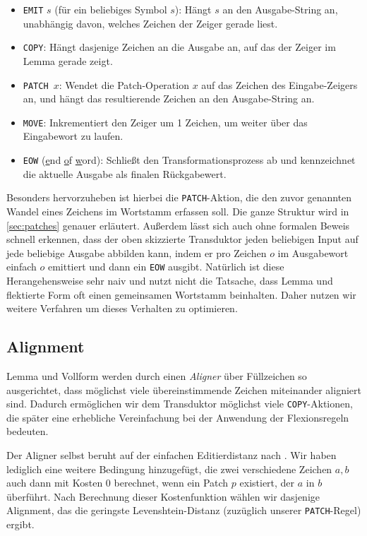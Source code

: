 \documentclass[11pt,a4paper]{article}
\newcommand{\action}[1]{\texttt{#1}}
\begin{document}
\begin{itemize}
    \item \action{EMIT} $s$ (für ein beliebiges Symbol $s$): Hängt $s$ an den Ausgabe-String an, unabhängig davon, welches Zeichen der Zeiger gerade liest.
    \item \action{COPY}: Hängt dasjenige Zeichen an die Ausgabe an, auf das der Zeiger im Lemma gerade zeigt.
    \item \action{PATCH $x$}: Wendet die Patch-Operation $x$ auf das Zeichen des Eingabe-Zeigers an, und hängt das resultierende Zeichen an den Ausgabe-String an.
    \item \action{MOVE}: Inkrementiert den Zeiger um 1 Zeichen, um weiter über das Eingabewort zu laufen.
    \item \action{EOW} (\underline{e}nd \underline{o}f \underline{w}ord): Schließt den Transformationsprozess ab und kennzeichnet die aktuelle Ausgabe als finalen Rückgabewert.
\end{itemize}

Besonders hervorzuheben ist hierbei die \action{PATCH}-Aktion, die den zuvor genannten Wandel eines Zeichens im Wortstamm erfassen soll. Die ganze Struktur wird in \autoref{sec:patches} genauer erläutert.
Außerdem lässt sich auch ohne formalen Beweis schnell erkennen, dass der oben skizzierte Transduktor jeden beliebigen Input auf jede beliebige Ausgabe abbilden kann, indem er pro Zeichen $o$ im Ausgabewort einfach $o$ emittiert und dann ein \action{EOW} ausgibt. Natürlich ist diese Herangehensweise sehr naiv und nutzt nicht die Tatsache, dass Lemma und flektierte Form oft einen gemeinsamen Wortstamm beinhalten. Daher nutzen wir weitere Verfahren um dieses Verhalten zu optimieren.

\subsection{Alignment}
\label{sec:alignment}
Lemma und Vollform werden durch einen \textit{Aligner} über Füllzeichen so ausgerichtet, dass möglichst viele übereinstimmende Zeichen miteinander aligniert sind. Dadurch ermöglichen wir dem Transduktor möglichst viele \action{COPY}-Aktionen, die später eine erhebliche Vereinfachung bei der Anwendung der Flexionsregeln bedeuten.

Der Aligner selbst beruht auf der einfachen Editierdistanz nach \citet{levenshtein:binary66}. Wir haben lediglich eine weitere Bedingung hinzugefügt, die zwei verschiedene Zeichen $a, b$ auch dann mit Kosten $0$ berechnet, wenn ein Patch $p$ existiert, der $a$ in $b$ überführt. Nach Berechnung dieser Kostenfunktion wählen wir dasjenige Alignment, das die geringste Levenshtein-Distanz (zuzüglich unserer \action{PATCH}-Regel) ergibt.
\end{document}
